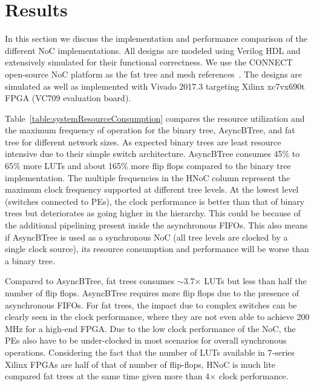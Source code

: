 \section{Results}
\label{sec:result}

In this section we discuss the implementation and performance comparison of the different NoC implementations.
All designs are modeled using Verilog HDL and extensively simulated for their functional correctness.
We use the CONNECT open-source NoC platform as the fat tree and mesh references~\cite{papa_connect_fpga2012}.
The designs are simulated as well as implemented with Vivado 2017.3 targeting Xilinx xc7vx690t FPGA (VC709 evaluation board).


Table~\ref{table:systemResourceConsumption} compares the resource utilization and the maximum frequency of operation for the binary tree, AsyncBTree, and fat tree for different network sizes.
As expected binary trees are least resource intensive due to their simple switch architecture.
AsyncBTree consumes 45\% to 65\% more LUTs and about 165\% more flip flops compared to the binary tree implementation.
The multiple frequencies in the HNoC column represent the maximum clock frequency supported at different tree levels.
At the lowest level (switches connected to PEs), the clock performance is better than that of binary trees but deteriorates as going higher in the hierarchy.
This could be because of the additional pipelining present inside the asynchronous FIFOs.
This also means if AsyncBTree is used as a synchronous NoC (all tree levels are clocked by a single clock source), its resource consumption and performance will be worse than a binary tree. 

Compared to AsyncBTree, fat trees consumes $\sim$3.7$\times$ LUTs but less than half the number of flip flops.
AsyncBTree requires more flip flops due to the presence of asynchronous FIFOs.
For fat trees, the impact due to complex switches can be clearly seen in the clock performance, where they are not even able to achieve 200 MHz for a high-end FPGA.
Due to the low clock performance of the NoC, the PEs also have to be under-clocked in most scenarios for overall synchronous operations.
Considering the fact that the number of LUTs available in 7-series Xilinx FPGAs are half of that of number of flip-flops, HNoC is much lite compared fat trees at the same time given more than 4$\times$ clock performance.


